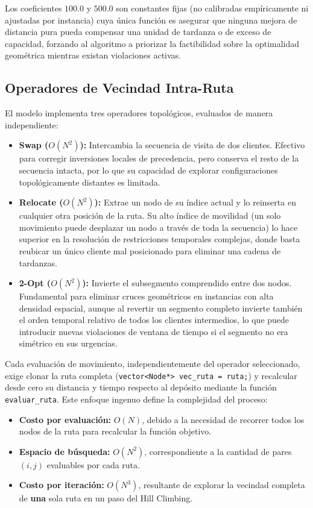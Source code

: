 \documentclass[letter, 10pt]{article}
\begin{document}
Los coeficientes $100.0$ y $500.0$ son constantes fijas (no calibradas emp\'iricamente ni ajustadas por instancia) cuya \'unica funci\'on es asegurar que ninguna mejora de distancia pura pueda compensar una unidad de tardanza o de exceso de capacidad, forzando al algoritmo a priorizar la factibilidad sobre la optimalidad geom\'etrica mientras existan violaciones activas.

\subsection{Operadores de Vecindad Intra-Ruta}

El modelo implementa tres operadores topol\'ogicos, evaluados de manera independiente:

\begin{itemize}
\item \textbf{Swap ($O(N^2)$):} Intercambia la secuencia de visita de dos clientes. Efectivo para corregir inversiones locales de precedencia, pero conserva el resto de la secuencia intacta, por lo que su capacidad de explorar configuraciones topol\'ogicamente distantes es limitada.
\item \textbf{Relocate ($O(N^2)$):} Extrae un nodo de su \'indice actual y lo reinserta en cualquier otra posici\'on de la ruta. Su alto \'indice de movilidad (un solo movimiento puede desplazar un nodo a trav\'es de toda la secuencia) lo hace superior en la resoluci\'on de restricciones temporales complejas, donde basta reubicar un \'unico cliente mal posicionado para eliminar una cadena de tardanzas.
\item \textbf{2-Opt ($O(N^2)$):} Invierte el subsegmento comprendido entre dos nodos. Fundamental para eliminar cruces geom\'etricos en instancias con alta densidad espacial, aunque al revertir un segmento completo invierte tambi\'en el orden temporal relativo de todos los clientes intermedios, lo que puede introducir nuevas violaciones de ventana de tiempo si el segmento no era sim\'etrico en sus urgencias.
\end{itemize}

Cada evaluaci\'on de movimiento, independientemente del operador seleccionado, exige clonar la ruta completa (\texttt{vector<Node*> vec\_ruta = ruta;}) y recalcular desde cero su distancia y tiempo respecto al dep\'osito mediante la funci\'on \texttt{evaluar\_ruta}. Este enfoque ingenuo define la complejidad del proceso:

\begin{itemize}
    \item \textbf{Costo por evaluaci\'on:} $O(N)$, debido a la necesidad de recorrer todos los nodos de la ruta para recalcular la funci\'on objetivo.
    \item \textbf{Espacio de b\'usqueda:} $O(N^2)$, correspondiente a la cantidad de pares $(i,j)$ evaluables por cada ruta.
    \item \textbf{Costo por iteraci\'on:} $O(N^3)$, resultante de explorar la vecindad completa de \textbf{una} sola ruta en un paso del Hill Climbing.
\end{itemize}
\end{document}
